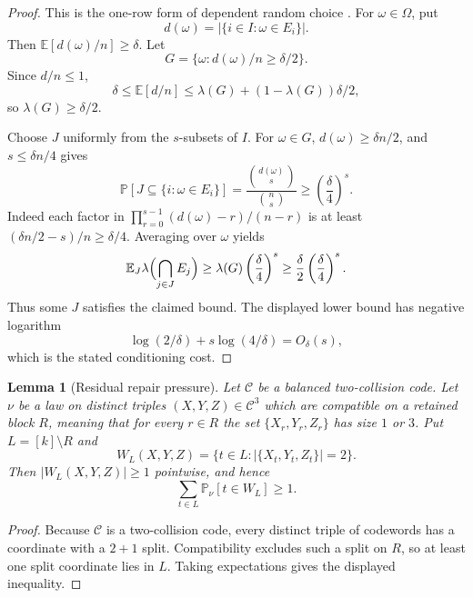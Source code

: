 \documentclass[11pt]{article}
\newtheorem{lemma}[theorem]{Lemma}
\newcommand{\C}{\mathcal C}
\newcommand{\Prb}{\mathbb P}
\newcommand{\EE}{\mathbb E}
\begin{document}
\begin{proof}
This is the one-row form of dependent random choice \cite{FoxSudakov11}.
For $\omega\in\Omega$, put
\[
  d(\omega)=|\{i\in I:\omega\in E_i\}|.
\]
Then $\EE[d(\omega)/n]\ge\delta$.  Let
\[
  G=\{\omega:d(\omega)/n\ge\delta/2\}.
\]
Since $d/n\le 1$,
\[
  \delta\le \EE[d/n]\le \lambda(G)+(1-\lambda(G))\delta/2,
\]
so $\lambda(G)\ge\delta/2$.

	Choose $J$ uniformly from the $s$-subsets of $I$.  For $\omega\in G$,
	$d(\omega)\ge\delta n/2$, and $s\le\delta n/4$ gives
	\[
	  \Prb[J\subseteq \{i:\omega\in E_i\}]
	  =
	  \frac{\binom{d(\omega)}s}{\binom ns}
	  \ge
	  \left(\frac{\delta}{4}\right)^s.
	\]
	Indeed each factor in
	$\prod_{r=0}^{s-1}(d(\omega)-r)/(n-r)$ is at least
	$(\delta n/2-s)/n\ge\delta/4$.
	Averaging over $\omega$ yields
\[
  \EE_J \lambda\Bigl(\bigcap_{j\in J}E_j\Bigr)
  \ge
  \lambda(G)\left(\frac{\delta}{4}\right)^s
  \ge
  \frac{\delta}{2}\left(\frac{\delta}{4}\right)^s.
\]
Thus some $J$ satisfies the claimed bound.
The displayed lower bound has negative logarithm
\[
  \log(2/\delta)+s\log(4/\delta)=O_\delta(s),
\]
which is the stated conditioning cost.
\end{proof}

\begin{lemma}[Residual repair pressure]
\label{lem:residual-pressure}
Let $\C$ be a balanced two-collision code.  Let
$\nu$ be a law on distinct triples $(X,Y,Z)\in\C^3$ which are compatible on a
retained block $R$, meaning that for every $r\in R$ the set
$\{X_r,Y_r,Z_r\}$ has size $1$ or $3$.  Put $L=[k]\setminus R$ and
\[
  W_L(X,Y,Z)=\{t\in L:|\{X_t,Y_t,Z_t\}|=2\}.
\]
Then $|W_L(X,Y,Z)|\ge 1$ pointwise, and hence
\[
  \sum_{t\in L}\Prb_\nu[t\in W_L]\ge 1.
\]
\end{lemma}

\begin{proof}
Because $\C$ is a two-collision code, every distinct triple of codewords has
a coordinate with a $2+1$ split.  Compatibility excludes such a split on
$R$, so at least one split coordinate lies in $L$.  Taking expectations gives
the displayed inequality.
\end{proof}
\end{document}

